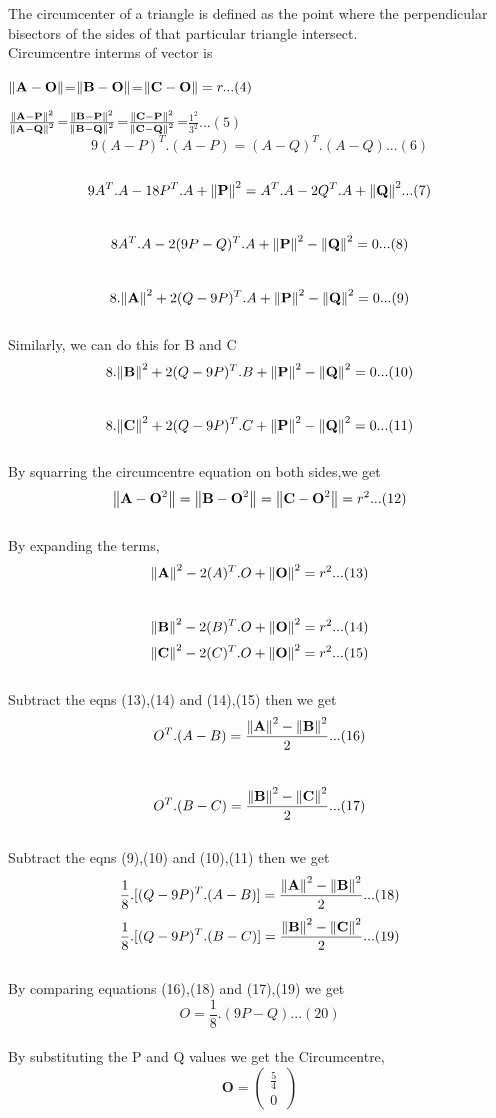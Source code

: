 \documentclass[10pt, a4paper]{article}
\let\vec\mathbf
\begin{document}
The circumcenter of a triangle is defined as the point where the perpendicular bisectors of the sides of that particular triangle intersect.
\\
Circumcentre interms of vector is
\\
\begin{center}
$\norm{\vec{A-O}}$=$\norm{\vec{B-O}}$=$\norm{\vec{C-O}}=r...(4)$
\\
\end{center}
\begin{center}
$\frac{\norm{\vec{A-P}}^2}{\norm{\vec{A-Q}}^2}$=$\frac{\norm{\vec{B-P}}^2}{\norm{\vec{B-Q}}^2}$=$\frac{\norm{\vec{C-P}}^2}{\norm{\vec{C-Q}}^2}$=$\frac{1^2}{3^2}...(5)$\\
$$9(A-P)^T.(A-P)=(A-Q)^T.(A-Q) ...(6)$$\\
$$9A^T.A-18P^T.A+\norm{\vec{P}}^2=A^T.A-2Q^T.A+\norm{\vec{Q}}^2 ...(7)$$\\
$$8A^T.A-2(9P-Q)^T.A+\norm{\vec{P}}^2-\norm{\vec{Q}}^2=0 ...(8)$$\\
$$8.\norm{\vec{A}}^2+2(Q-9P)^T.A+\norm{\vec{P}}^2-\norm{\vec{Q}}^2=0...(9)$$\\
Similarly, we can do this for B and C\\
$$8.\norm{\vec{B}}^2+2(Q-9P)^T.B+\norm{\vec{P}}^2-\norm{\vec{Q}}^2=0...(10)$$\\
$$8.\norm{\vec{C}}^2+2(Q-9P)^T.C+\norm{\vec{P}}^2-\norm{\vec{Q}}^2=0...(11)$$\\
By squarring the circumcentre equation on both sides,we get\\
$$\norm{\vec{A-O}^2}=\norm{\vec{B-O}^2}=\norm{\vec{C-O}^2}=r^2...(12)$$\\
By expanding the terms,
$$\norm{\vec{A}}^2-2(A)^T.O+\norm{\vec{O}}^2=r^2...(13)$$\\
$$\norm{\vec{B}}^2-2(B)^T.O+\norm{\vec{O}}^2=r^2...(14)$$
$$\norm{\vec{C}}^2-2(C)^T.O+\norm{\vec{O}}^2=r^2...(15)$$\\
Subtract the eqns (13),(14) and (14),(15) then we get\\
$$O^T.(A-B)=\frac{\norm{\vec{A}}^2-\norm{\vec{B}}^2}{2}...(16)$$\\
$$O^T.(B-C)=\frac{\norm{\vec{B}}^2-\norm{\vec{C}}^2}{2}...(17)$$\\
Subtract the eqns (9),(10) and (10),(11) then we get\\
$$\frac{1}{8}.[(Q-9P)^T.(A-B)]=\frac{\norm{\vec{A}}^2-\norm{\vec{B}}^2}{2}...(18)$$
$$\frac{1}{8}.[(Q-9P)^T.(B-C)]=\frac{\norm{\vec{B}}^2-\norm{\vec{C}}^2}{2}...(19)$$\\
By comparing equations (16),(18) and (17),(19) we get\\
$$O=\frac{1}{8}.(9P-Q) ...(20)$$\\
By substituting the P and Q values we get the Circumcentre,\\
$$\vec{O}=\begin{pmatrix} \frac{5}{4}\\ 0\ \end{pmatrix} $$

\end{center}
 
\end{document}
